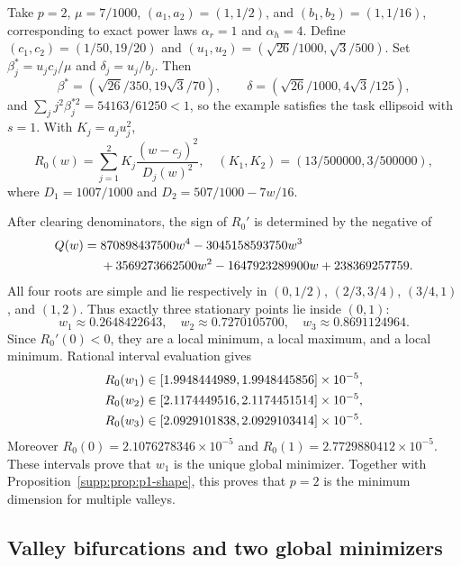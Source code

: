 Take $p=2$, $\mu=7/1000$, $(a_1,a_2)=(1,1/2)$, and $(b_1,b_2)=(1,1/16)$, corresponding to exact power laws $\alpha_r=1$ and $\alpha_h=4$. Define $(c_1,c_2)=(1/50,19/20)$ and $(u_1,u_2)=(\sqrt{26}/1000,\sqrt3/500)$. Set $\beta_j^*=u_jc_j/\mu$ and $\delta_j=u_j/b_j$. Then
\begin{equation}
 \beta^*=(\sqrt{26}/350,19\sqrt3/70),\qquad
 \delta=(\sqrt{26}/1000,4\sqrt3/125),
\end{equation}
and $\sum_jj^2\beta_j^{*2}=54163/61250<1$, so the example satisfies the task ellipsoid with $s=1$. With $K_j=a_j u_j^2$,
\begin{equation}
 R_0(w)=\sum_{j=1}^2K_j\frac{(w-c_j)^2}{D_j(w)^2},\quad
 (K_1,K_2)=(13/500000,3/500000),
\end{equation}
where $D_1=1007/1000$ and $D_2=507/1000-7w/16$.

After clearing denominators, the sign of $R_0'$ is determined by the negative of
\begin{align}
 Q(w)={}&870898437500w^4-3045158593750w^3\notag\\
 &+3569273662500w^2-1647923289900w+238369257759.
\end{align}
All four roots are simple and lie respectively in $(0,1/2)$, $(2/3,3/4)$, $(3/4,1)$, and $(1,2)$. Thus exactly three stationary points lie inside $(0,1)$:
\begin{equation}
 w_1\approx0.2648422643,\quad w_2\approx0.7270105700,\quad w_3\approx0.8691124964.
\end{equation}
Since $R_0'(0)<0$, they are a local minimum, a local maximum, and a local minimum. Rational interval evaluation gives
\begin{align}
 R_0(w_1)&\in[1.9948444989,1.9948445856]\times10^{-5},\notag\\
 R_0(w_2)&\in[2.1174449516,2.1174451514]\times10^{-5},\notag\\
 R_0(w_3)&\in[2.0929101838,2.0929103414]\times10^{-5}.
\end{align}
Moreover $R_0(0)=2.1076278346\times10^{-5}$ and $R_0(1)=2.7729880412\times10^{-5}$. These intervals prove that $w_1$ is the unique global minimizer. Together with Proposition~\ref{supp:prop:p1-shape}, this proves that $p=2$ is the minimum dimension for multiple valleys.

\subsection{Valley bifurcations and two global minimizers}

